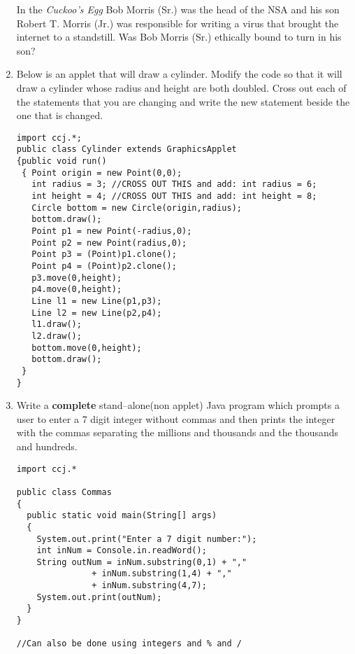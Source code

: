 \begin{enumerate}
    In the {\em Cuckoo's Egg} Bob Morris (Sr.) was the head of
    the NSA and his son Robert T. Morris (Jr.) was responsible for
    writing a virus that brought the internet to a standstill. Was
    Bob Morris (Sr.) ethically bound to turn in his son?

\item Below is an applet that will draw a cylinder. Modify the code
so that it will draw a cylinder whose radius and height are both doubled.
Cross out each of the statements that you are changing and write the new
statement beside the one that is changed.

\begin{verbatim}
import ccj.*;
public class Cylinder extends GraphicsApplet
{public void run()
 { Point origin = new Point(0,0);
   int radius = 3; //CROSS OUT THIS and add: int radius = 6;
   int height = 4; //CROSS OUT THIS and add: int height = 8;
   Circle bottom = new Circle(origin,radius);
   bottom.draw();
   Point p1 = new Point(-radius,0);
   Point p2 = new Point(radius,0);
   Point p3 = (Point)p1.clone();
   Point p4 = (Point)p2.clone();
   p3.move(0,height);
   p4.move(0,height);
   Line l1 = new Line(p1,p3);
   Line l2 = new Line(p2,p4);
   l1.draw();
   l2.draw();
   bottom.move(0,height);
   bottom.draw();
 }
}
\end{verbatim}

\item Write a {\bf complete} stand--alone(non applet) Java program which
prompts a user to enter a 7 digit integer without commas and then
prints the integer with the commas separating the millions and thousands
and the thousands and hundreds.

\begin{verbatim}
import ccj.*

public class Commas
{
  public static void main(String[] args)
  {
    System.out.print("Enter a 7 digit number:");
    int inNum = Console.in.readWord();
    String outNum = inNum.substring(0,1) + ","
               + inNum.substring(1,4) + ","
               + inNum.substring(4,7);
    System.out.print(outNum);
  }
}

//Can also be done using integers and % and /
\end{verbatim}
\end{enumerate}

